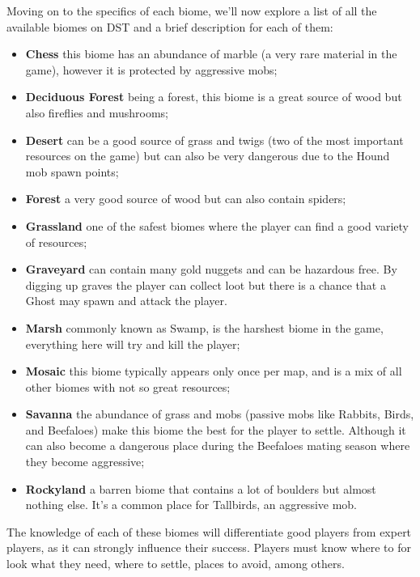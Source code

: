 Moving on to the specifics of each biome, we'll now explore a list of all the available biomes on \ac{DST} and a brief description for each of them:

\begin{itemize}
\item \textbf{Chess} this biome has an abundance of marble (a very rare material in the game), however it is protected by aggressive mobs;
\item \textbf{Deciduous Forest} being a forest, this biome is a great source of wood but also fireflies and mushrooms;
\item \textbf{Desert} can be a good source of grass and twigs (two of the most important resources on the game) but can also be very dangerous due to the Hound mob spawn points;
\item \textbf{Forest} a very good source of wood but can also contain spiders;
\item \textbf{Grassland} one of the safest biomes where the player can find a good variety of resources;
\item \textbf{Graveyard} can contain many gold nuggets and can be hazardous free.
By digging up graves the player can collect loot but there is a chance that a Ghost may spawn and attack the player.
\item \textbf{Marsh} commonly known as Swamp, is the harshest biome in the game, everything here will try and kill the player;
\item \textbf{Mosaic} this biome typically appears only once per map, and is a mix of all other biomes with not so great resources;
\item \textbf{Savanna} the abundance of grass and mobs (passive mobs like Rabbits, Birds, and Beefaloes) make this biome the best for the player to settle.
Although it can also become a dangerous place during the Beefaloes mating season where they become aggressive;
\item \textbf{Rockyland} a barren biome that contains a lot of boulders but almost nothing else. It’s a common place for Tallbirds, an aggressive mob.
\end{itemize}


The knowledge of each of these biomes will differentiate good players from expert players, as it can strongly influence their success.
Players must know where to for look what they need, where to settle, places to avoid, among others.

